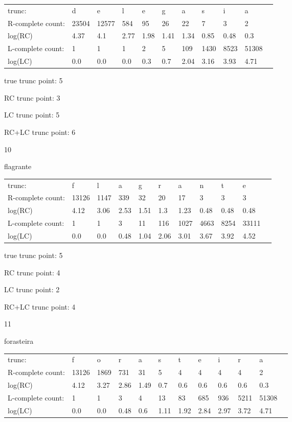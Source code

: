 \documentclass{article}
\begin{document}
\begin{tabular}{l|llllllllll}
trunc: & d & e & l & e & g & a & s & i & a & \\ 
R-complete count: & 23504 & 12577 & 584 & 95 & 26 & 22 & 7 & 3 & 2 & \\ 
log(RC) & 4.37 & 4.1 & 2.77 & 1.98 & 1.41 & 1.34 & 0.85 & 0.48 & 0.3 & \\ 
L-complete count: & 1 & 1 & 1 & 2 & 5 & 109 & 1430 & 8523 & 51308 & \\ 
log(LC) & 0.0 & 0.0 & 0.0 & 0.3 & 0.7 & 2.04 & 3.16 & 3.93 & 4.71 & \\ 
\end{tabular}

true trunc point: 5

RC trunc point: 3

LC trunc point: 5

RC+LC trunc point: 6

\vspace{1em}

10

flagrante

\begin{tabular}{l|llllllllll}
trunc: & f & l & a & g & r & a & n & t & e & \\ 
R-complete count: & 13126 & 1147 & 339 & 32 & 20 & 17 & 3 & 3 & 3 & \\ 
log(RC) & 4.12 & 3.06 & 2.53 & 1.51 & 1.3 & 1.23 & 0.48 & 0.48 & 0.48 & \\ 
L-complete count: & 1 & 1 & 3 & 11 & 116 & 1027 & 4663 & 8254 & 33111 & \\ 
log(LC) & 0.0 & 0.0 & 0.48 & 1.04 & 2.06 & 3.01 & 3.67 & 3.92 & 4.52 & \\ 
\end{tabular}

true trunc point: 5

RC trunc point: 4

LC trunc point: 2

RC+LC trunc point: 4

\vspace{1em}

11

forasteira

\begin{tabular}{l|lllllllllll}
trunc: & f & o & r & a & s & t & e & i & r & a & \\ 
R-complete count: & 13126 & 1869 & 731 & 31 & 5 & 4 & 4 & 4 & 4 & 2 & \\ 
log(RC) & 4.12 & 3.27 & 2.86 & 1.49 & 0.7 & 0.6 & 0.6 & 0.6 & 0.6 & 0.3 & \\ 
L-complete count: & 1 & 1 & 3 & 4 & 13 & 83 & 685 & 936 & 5211 & 51308 & \\ 
log(LC) & 0.0 & 0.0 & 0.48 & 0.6 & 1.11 & 1.92 & 2.84 & 2.97 & 3.72 & 4.71 & \\ 
\end{tabular}
\end{document}
